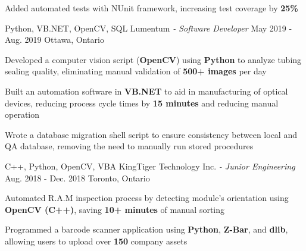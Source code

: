 \begin{siderules}
\begin{cventries}
{\begin{cvitems}
        \item {Added automated tests with NUnit framework, increasing test coverage by \textbf{25\%}}
      \end{cvitems}
    }
    \cventry
      {Python, VB.NET, OpenCV, SQL}
      {Lumentum\hspace{0.15em} \bodyfontlight\itshape{- Software Developer}}
      {May 2019 - Aug. 2019}
      {Ottawa, Ontario}
      {
        \begin{cvitems}
          \item {Developed a computer vision script (\textbf{OpenCV}) using \textbf{Python} to analyze tubing sealing quality, eliminating manual validation of \textbf{500+ images} per day}
          \item {Built an automation software in \textbf{VB.NET} to aid in manufacturing of optical devices, reducing process cycle times by \textbf{15 minutes} and reducing manual operation}
          \item {Wrote a database migration shell script to ensure consistency between local and QA database, removing the need to manually run stored procedures}
        \end{cvitems}
      }
    \cventry
      {C++, Python, OpenCV, VBA}
      {KingTiger Technology Inc.\hspace{0.15em} \bodyfontlight\itshape{- Junior Engineering}}
      {Aug. 2018 - Dec. 2018}
      {Toronto, Ontario}
      {
        \begin{cvitems}
          \item {Automated R.A.M inspection process by detecting module's orientation using \textbf{OpenCV (C++)}, saving \textbf{10+ minutes} of manual sorting}
          \item {Programmed a barcode scanner application using \textbf{Python}, \textbf{Z-Bar}, and \textbf{dlib}, allowing users to upload over \textbf{150} company assets }
        \end{cvitems}
      }
  \end{cventries}
\end{siderules}